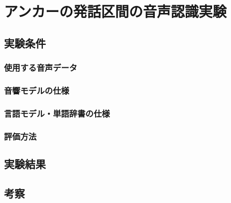 \chapter{アンカーの発話区間の音声認識実験}
\section{実験条件}
\subsection{使用する音声データ}
\subsection{音響モデルの仕様}
\subsection{言語モデル・単語辞書の仕様}
\subsection{評価方法}
\section{実験結果}
\section{考察}
